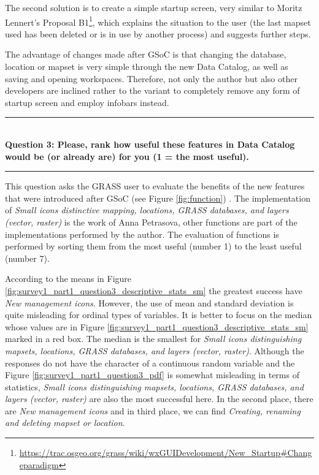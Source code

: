 \documentclass[a4paper,10pt,twoside]{article}
\begin{document}
The second solution is to create a simple startup screen, very similar
to Moritz Lennert's Proposal
B1\footnote{\url{https://trac.osgeo.org/grass/wiki/wxGUIDevelopment/New\_Startup\#Changeparadigm}},
which explains the situation to the user (the last mapset used has
been deleted or is in use by another process) and suggests further
steps.

The advantage of changes made after GSoC is that changing the
database, location or mapset is very simple through the new Data
Catalog, as well as saving and opening workspaces. Therefore, not only
the author but also other developers are inclined rather to the
variant to completely remove any form of startup screen and employ
infobars instead.

\par\noindent\rule{\textwidth}{0.4pt} \\
\noindent \textbf{Question 3: Please, rank how useful these features in Data Catalog would be (or already are) for you (1 = the most useful).}
\par\noindent\rule{\textwidth}{0.4pt}

\noindent This question asks the GRASS user to evaluate the benefits
of the new features that were introduced after GSoC (see Figure
\ref{fig:function}) . The implementation of \textit{Small icons
  distinctive mapping, locations, GRASS databases, and layers (vector,
  raster)} is the work of Anna Petrasova, other functions are part of
the implementations performed by the author. The evaluation of
functions is performed by sorting them from the most useful (number 1)
to the least useful (number 7).

According to the means in Figure
\ref{fig:survey1_part1_question3_descriptive_stats_sm} the greatest
success have \textit{New management icons}. However, the use of mean
and standard deviation is quite misleading for ordinal types of
variables. It is better to focus on the median whose values are in
Figure \ref{fig:survey1_part1_question3_descriptive_stats_sm} marked
in a red box. The median is the smallest for \textit{Small icons
  distinguishing mapsets, locations, GRASS databases, and layers
  (vector, raster)}. Although the responses do not have the character
of a continuous random variable and the Figure
\ref{fig:survey1_part1_question3_pdf} is somewhat misleading in terms
of statistics, \textit{Small icons distinguishing mapsets, locations,
  GRASS databases, and layers (vector, raster) } are also the most
successful here. In the second place, there are \textit{New management
  icons} and in third place, we can find \textit{Creating, renaming
  and deleting mapset or location}.
\end{document}
